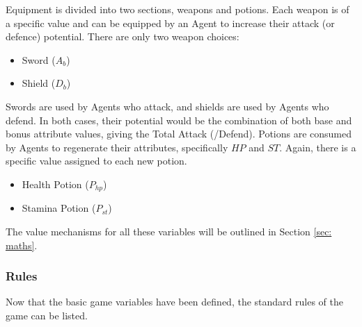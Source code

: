 Equipment is divided into two sections, weapons and potions. Each weapon is of a specific value and can be equipped by an Agent to increase their attack (or defence) potential. There are only two weapon choices:

\begin{itemize}
    \item Sword ($A_b$)
    \item Shield ($D_b$)
\end{itemize}

Swords are used by Agents who attack, and shields are used by Agents who defend. In both cases, their potential would be the combination of both base and bonus attribute values, giving the Total Attack (/Defend). Potions are consumed by Agents to regenerate their attributes, specifically $HP$ and $ST$. Again, there is a specific value assigned to each new potion. 

\begin{itemize}
    \item Health Potion ($P_{hp}$)
    \item Stamina Potion ($P_{st}$)
\end{itemize}

The value mechanisms for all these variables will be outlined in Section \ref{sec: maths}. 

\subsubsection{Rules}
Now that the basic game variables have been defined, the standard rules of the game can be listed. 

